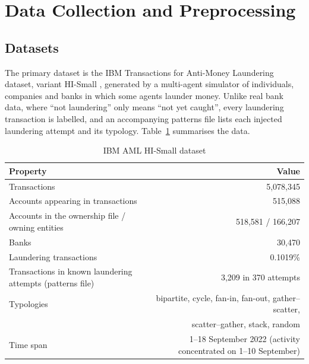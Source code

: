 \section{Data Collection and Preprocessing}

\subsection{Datasets}
The primary dataset is the IBM Transactions for Anti-Money Laundering dataset, variant HI-Small \cite{altman2023realistic}, generated by a multi-agent simulator of individuals, companies and banks in which some agents launder money. Unlike real bank data, where ``not laundering'' only means ``not yet caught'', every laundering transaction is labelled, and an accompanying patterns file lists each injected laundering attempt and its typology. Table~\ref{tab:dataset} summarises the data.

\begin{table}[H]
\centering
\renewcommand{\arraystretch}{1.25}
\begin{tabular}{|l|r|}
\hline
\textbf{Property} & \textbf{Value} \\ \hline
Transactions & 5,078,345 \\ \hline
Accounts appearing in transactions & 515,088 \\ \hline
Accounts in the ownership file / owning entities & 518,581 / 166,207 \\ \hline
Banks & 30,470 \\ \hline
Laundering transactions & 0.1019\% \\ \hline
Transactions in known laundering attempts (patterns file) & 3,209 in 370 attempts \\ \hline
Typologies & bipartite, cycle, fan-in, fan-out, gather--scatter, \\
 & scatter--gather, stack, random \\ \hline
Time span & 1--18 September 2022 (activity concentrated on 1--10 September) \\ \hline
\end{tabular}
\caption{IBM AML HI-Small dataset}
\label{tab:dataset}
\end{table}

